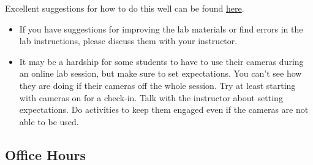 \documentclass[
]{article}
\begin{document}
\begin{itemize}
\end{itemize}

Excellent suggestions for how to do this well can be found \href{https://mine-cetinkaya-rundel.github.io/golive-uscots/golive.html\#1}{here}.

\begin{itemize}
\item
  If you have suggestions for improving the lab materials or find errors in the lab instructions, please discuss them with your instructor.
\item
  It may be a hardship for some students to have to use their cameras during an online lab session, but make sure to set expectations. You can't see how they are doing if their cameras off the whole session. Try at least starting with cameras on for a check-in. Talk with the instructor about setting expectations. Do activities to keep them engaged even if the cameras are not able to be used.
\end{itemize}

\hypertarget{office-hours}{%
\subsection{Office Hours}\label{office-hours}}
\end{document}
